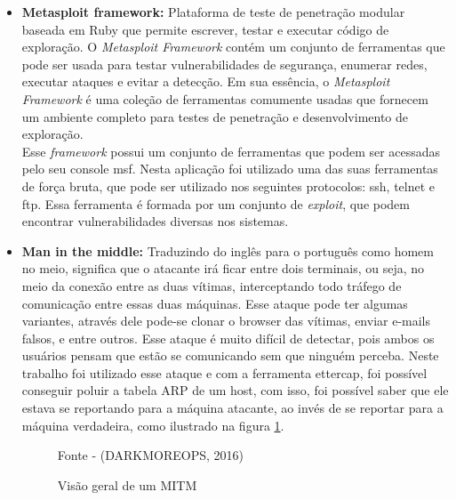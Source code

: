 \begin{itemize}
\item \textbf{Metasploit framework: } Plataforma de teste de penetração modular baseada em Ruby que permite escrever, testar e executar código de exploração. O \textit{Metasploit Framework} contém um conjunto de ferramentas que pode ser usada para testar vulnerabilidades de segurança, enumerar redes, executar ataques e evitar a detecção. Em sua essência, o \textit{Metasploit Framework} é uma coleção de ferramentas comumente usadas que fornecem um ambiente completo para testes de penetração e desenvolvimento de exploração.\\

Esse \textit{framework} possui um conjunto de ferramentas que podem ser acessadas pelo seu console msf. Nesta aplicação foi utilizado uma das suas ferramentas de força bruta, que pode ser utilizado nos seguintes protocolos: ssh, telnet e ftp. Essa ferramenta é formada por um conjunto de \textit{exploit}, que podem encontrar vulnerabilidades diversas nos sistemas.\\

\item \textbf{Man in the middle: } Traduzindo do inglês para o português como homem no meio, significa que o atacante irá ficar entre dois terminais, ou seja, no meio da conexão entre as duas vítimas, interceptando todo tráfego de comunicação entre essas duas máquinas. Esse ataque pode ter algumas variantes, através dele pode-se clonar o browser das vítimas, enviar e-mails falsos, e entre outros. Esse ataque é muito difícil de detectar, pois ambos os usuários pensam que estão se comunicando sem que ninguém perceba. Neste trabalho foi utilizado esse ataque e com a ferramenta ettercap, foi possível conseguir poluir a tabela ARP de um host, com isso, foi possível saber que ele estava se reportando para a máquina atacante, ao invés de se reportar para a máquina verdadeira, como ilustrado na figura \ref{Fig:Visão geral do mitm}.


\begin{figure}[htbp!] 
\begin{center}
\caption{Visão geral de um MITM }
\small{Fonte - (DARKMOREOPS, 2016)}
\label{Fig:Visão geral do mitm}
\end{center} 
\end{figure}


\end{itemize}
